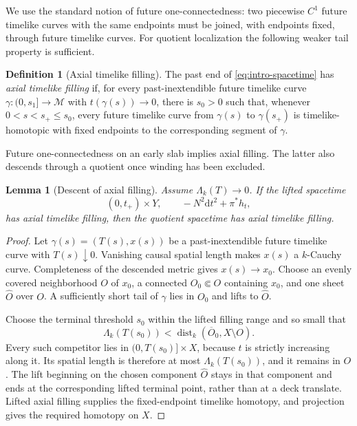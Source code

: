 \documentclass[10pt,a4paper]{article}
\numberwithin{equation}{section}
\newtheorem{lemma}[theorem]{Lemma}
\theoremstyle{definition}
\newtheorem{definition}[theorem]{Definition}
\theoremstyle{remark}
\newcommand{\dd}{\mathrm d}
\newcommand{\cM}{\mathcal M}
\begin{document}
We use the standard notion of future one-connectedness: two piecewise $C^1$
future timelike curves with the same endpoints must be joined, with endpoints
fixed, through future timelike curves.  For quotient localization the
following weaker tail property is sufficient.

\begin{definition}[Axial timelike filling]
The past end of \eqref{eq:intro-spacetime} has \emph{axial timelike filling}
if, for every past-inextendible future timelike curve
$\gamma:(0,s_1]\to\cM$ with $t(\gamma(s))\to0$, there is $s_0>0$ such that,
whenever $0<s<s_+\le s_0$, every future timelike curve from $\gamma(s)$ to
$\gamma(s_+)$ is timelike-homotopic with fixed endpoints to the corresponding
segment of $\gamma$.
\end{definition}

Future one-connectedness on an early slab implies axial filling.  The latter
also descends through a quotient once winding has been excluded.

\begin{lemma}[Descent of axial filling]
\label{lem:filling-descent}
Assume $\Lambda_k(T)\to0$.  If the lifted spacetime
\[
 (0,t_+)\times Y,\qquad -N^2\dd t^2+\pi^*h_t,
\]
has axial timelike filling, then the quotient spacetime has axial timelike
filling.
\end{lemma}

\begin{proof}
Let $\gamma(s)=(T(s),x(s))$ be a past-inextendible future timelike curve with
$T(s)\downarrow0$.  Vanishing causal spatial length makes $x(s)$ a
$k$-Cauchy curve.  Completeness of the descended metric gives
$x(s)\to x_0$.  Choose an evenly covered neighborhood $O$ of $x_0$, a
connected $O_0\Subset O$ containing $x_0$, and one sheet $\widehat O$ over
$O$.  A sufficiently short tail of $\gamma$ lies in $O_0$ and lifts to
$\widehat O$.

Choose the terminal threshold $s_0$ within the lifted filling range and so
small that
\[
 \Lambda_k(T(s_0))<\operatorname{dist}_k(\overline O_0,X\setminus O).
\]
Every such competitor lies in $(0,T(s_0)]\times X$, because $t$ is
strictly increasing along it.  Its spatial length is therefore at most
$\Lambda_k(T(s_0))$, and it remains in $O$.  The lift beginning on the
chosen component $\widehat O$ stays in that component and ends at the
corresponding lifted terminal point, rather than at a deck translate.
Lifted axial filling supplies the
fixed-endpoint timelike homotopy, and projection gives the required homotopy
on $X$.
\end{proof}
\end{document}

